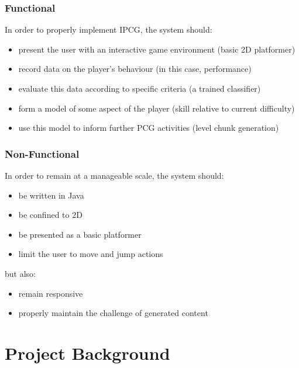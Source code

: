 \documentclass[a4paper,oneside,12pt,openany]{memoir}
\begin{document}
\subsection{Functional}
In order to properly implement IPCG, the system should:
\begin{itemize}[-]
\item present the user with an interactive game environment (basic 2D platformer)
\item record data on the player's behaviour (in this case, performance)
\item evaluate this data according to specific criteria (a trained classifier)
\item form a model of some aspect of the player (skill relative to current difficulty)
\item use this model to inform further PCG activities (level chunk generation)
\end{itemize}

\subsection{Non-Functional}
In order to remain at a manageable scale, the system should:
\begin{itemize}[-]
\item be written in Java
\item be confined to 2D
\item be presented as a basic platformer
\item limit the user to move and jump actions
\end{itemize}
but also:
\begin{itemize}[-]
  \item remain responsive
  \item properly maintain the challenge of generated content
\end{itemize}

\chapter{Project Background}
\end{document}
